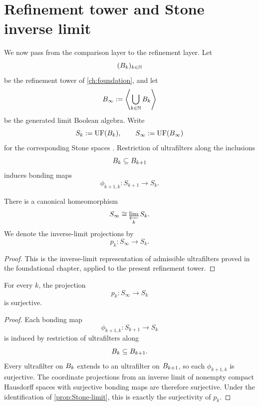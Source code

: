 \section{Refinement tower and Stone inverse limit}
We now pass from the comparison layer to the refinement layer.
Let
\[
	(B_k)_{k\in\mathbb N}
\]
be the refinement tower of \cref{ch:foundation}, and let
\[
	B_\infty
	:=
	\left\langle \bigcup_{k\in\mathbb N}B_k\right\rangle
\]
be the generated limit Boolean algebra.  Write
\[
	S_k:=\operatorname{UF}(B_k),
	\qquad
	S_\infty:=\operatorname{UF}(B_\infty)
\]
for the corresponding Stone spaces \cite{Stone1936}.  Restriction of ultrafilters along
the inclusions
\[
	B_k\subseteq B_{k+1}
\]
induces bonding maps
\[
	\phi_{k+1,k}\colon S_{k+1}\to S_k.
\]
\begin{proposition}
	\label{prop:Stone-limit}
	There is a canonical homeomorphism
	\[
		S_\infty\cong \varprojlim_k S_k.
	\]
	We denote the inverse-limit projections by
	\[
		p_k\colon S_\infty\to S_k.
	\]
\end{proposition}
\begin{proof}
	This is the inverse-limit representation of admissible ultrafilters
	proved in the foundational chapter, applied to the present refinement
	tower.
\end{proof}
\begin{lemma}
	\label{lem:pk-surjective}
	For every \(k\), the projection
	\[
		p_k\colon S_\infty\to S_k
	\]
	is surjective.
\end{lemma}
\begin{proof}
	Each bonding map
	\[
		\phi_{k+1,k}\colon S_{k+1}\to S_k
	\]
	is induced by restriction of ultrafilters along
	\[
		B_k\subseteq B_{k+1}.
	\]
	Every ultrafilter on \(B_k\) extends to an ultrafilter on
	\(B_{k+1}\), so each \(\phi_{k+1,k}\) is surjective.  The coordinate
	projections from an inverse limit of nonempty compact Hausdorff spaces
	with surjective bonding maps are therefore surjective.  Under the
	identification of \cref{prop:Stone-limit}, this is exactly the
	surjectivity of \(p_k\).
\end{proof}
